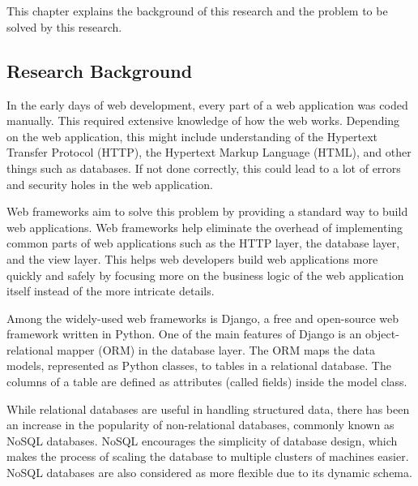 \chapter{\babSatu}

This chapter explains the background of this research and the problem to be
solved by this research.

\section{Research Background}

In the early days of web development, every part of a web application was coded
manually. This required extensive knowledge of how the web works. Depending on
the web application, this might include understanding of the Hypertext Transfer
Protocol (HTTP), the Hypertext Markup Language (HTML), and other things such as
databases. If not done correctly, this could lead to a lot of errors and
security holes in the web application.

Web frameworks aim to solve this problem by providing a standard way to build
web applications. Web frameworks help eliminate the overhead of implementing
common parts of web applications such as the HTTP layer, the database layer,
and the view layer. This helps web developers build web applications more
quickly and safely by focusing more on the business logic of the web
application itself instead of the more intricate details.

Among the widely-used web frameworks is Django, a free and open-source web
framework written in Python. One of the main features of Django is an
object-relational mapper (ORM) in the database layer. The ORM maps the data
models, represented as Python classes, to tables in a relational database. The
columns of a table are defined as attributes (called fields) inside the model
class.

While relational databases are useful in handling structured data, there has
been an increase in the popularity of non-relational databases, commonly known
as NoSQL databases. NoSQL encourages the simplicity of database design, which
makes the process of scaling the database to multiple clusters of machines
easier. NoSQL databases are also considered as more flexible due to its dynamic
schema.

